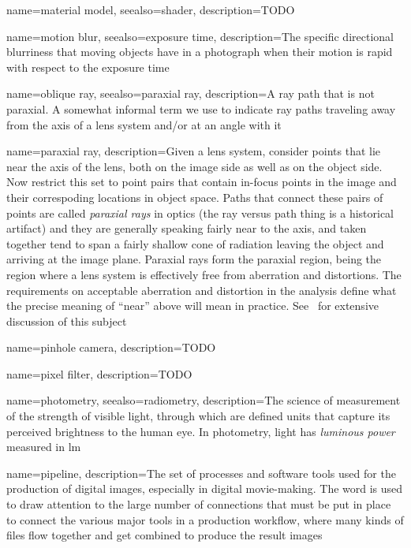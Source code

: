 {
	name={material model},
	seealso={shader},
	description={TODO}
}

{
	name={motion blur},
	seealso={exposure time},
	description={The specific directional blurriness that moving objects
		have in a photograph when their motion is rapid with respect 
		to the \gls{exposure time}}
}

{
	name={oblique ray},
	seealso={paraxial ray},
	description={A ray path that is not paraxial. 
		A somewhat informal term we use to indicate ray paths traveling
		away from the axis of a lens system and/or at an angle with it}
}

{
	name={paraxial ray},
	description={Given a lens system, consider points that lie near the axis of the lens,
		both on the image side as well as on the object side. 
		Now restrict this set to point pairs that contain in-focus points in the image and their
		correspoding locations in object space.
		Paths that connect these pairs of points are called \textsl{paraxial rays} in optics
		(the ray versus path thing is a historical artifact) and they are generally speaking
		fairly near to the axis, and taken together tend to span a fairly shallow cone of 
		radiation leaving the object and arriving at the image plane.
		Paraxial rays form the paraxial region, being the region where a lens system is
		effectively free from aberration and distortions.
		The requirements on acceptable aberration and distortion in the analysis define what
		the precise meaning of ``near'' above will mean in practice.
		See~\cite{kingslake2010} for extensive discussion of this subject}
}

{
	name={pinhole camera},
	description={TODO}
}

{
	name={pixel filter},
	description={TODO}
}

{
	name={photometry},
	seealso={radiometry},
	description={The science of measurement of the strength of visible light, 
		through which are defined units that capture its perceived brightness 
		to the human eye. In photometry, light has \textsl{luminous power} 
		measured in \unit{\lumen}}
}


{
	name={pipeline},
	description={The set of processes and software tools used for the production of 
		digital images, especially in digital movie-making. The word is used to draw
		attention to the large number of connections that must be put in place to 
		connect the various major tools in a production workflow, where many kinds
		of files flow together and get combined to produce the result images}
}

